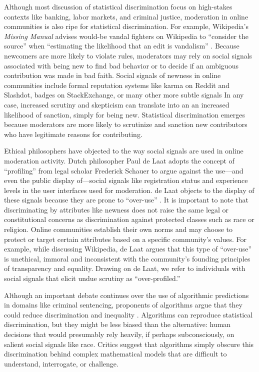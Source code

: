 \documentclass[format=acmsmall, natbib=true,  screen=true]{acmart}
\begin{document}
Although most discussion of statistical discrimination focus on high-stakes contexts like banking, labor markets, and criminal justice, moderation in online communities is also ripe for statistical discrimination.
For example, Wikipedia's \textit{Missing Manual} advises would-be vandal fighters on Wikipedia to ``consider the source'' when ``estimating the likelihood that an edit is vandalism'' \cite{broughton_wikipedia_2008}.
Because newcomers are more likely to violate rules, moderators may rely on social signals 
associated with being new to find bad behavior or to decide if an ambiguous contribution was made in bad faith.
Social signals of newness in online communities include formal reputation systems like karma on Reddit and Slashdot, badges on StackExchange, or many other more subtle signals \cite{grimmelmann_virtues_2015, lampe_role_2012, merchant_signals_2019}
In any case, increased scrutiny and skepticism can translate into an an increased likelihood of sanction, simply for being new.  
Statistical discrimination emerges because moderators are more likely to scrutinize and sanction new contributors who have legitimate reasons for contributing. 


Ethical philosophers have objected to the way social signals are used in online moderation activity. Dutch philosopher Paul de Laat adopts the concept of ``profiling'' from legal scholar Frederick Schauer to argue against the use---and even the public display of---social signals like registration status and experience levels in the user interfaces used for moderation. de Laat objects to the display of these signals because they are prone to ``over-use'' \cite{de_laat_use_2015, de_laat_profiling_2016}. It is important to note that discriminating by attributes like newness does not raise the same legal or constitutional concerns as discrimination against protected classes such as race or religion.  Online communities establish their own norms and may choose to protect or target certain attributes based on a specific community's values. 
For example, while discussing Wikipedia, de Laat argues that this type of ``over-use'' is unethical, immoral and inconsistent with the community's founding principles of transparency and equality. Drawing on de Laat, we refer to individuals with social signals that elicit undue scrutiny as ``over-profiled.''

Although an important debate continues over the use of algorithmic predictions in domains like criminal sentencing, proponents of algorithms argue that they could reduce discrimination and inequality \cite{kleinberg_human_2018, stevenson_assessing_2017}. Algorithms can reproduce statistical discrimination, but they might be less biased than the alternative: human decisions that would presumably rely heavily, if perhaps subconsciously, on salient social signals like race. Critics suggest that algorithms simply obscure this discrimination behind complex mathematical models that are difficult to understand, interrogate, or challenge.
\end{document}
